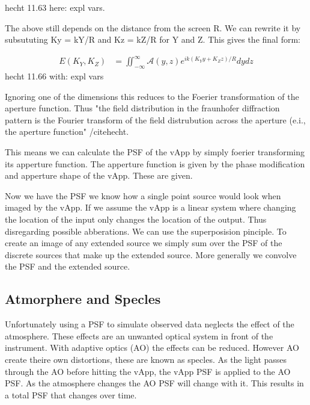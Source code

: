 hecht 11.63
here: expl vars.  

The above still depends on the distance from the screen R. We can rewrite it by subsututing Ky = kY/R and Kz = kZ/R for Y and Z. This gives the final form: 

\begin{subequations}
  \begin{align}
    E(K_Y,K_Z) &= \iint_{-\infty}^{\infty} \mathscr{A}(y,z) e^{ik(K_Yy+K_Zz)/R} dydz
  \end{align}
\end{subequations}
hecht 11.66
with: expl vars

Ignoring one of the dimensions this reduces to the Foerier transformation of the aperture function. Thus "the field distribution in the fraunhofer diffraction pattern is the Fourier transform of the field distrubution across the aperture (e.i., the aperture function" /cite{hecht}. 

This means we can calculate the PSF of the vApp by simply foerier transforming its apperture function. The apperture function is given by the phase modification and apperture shape of the vApp. These are given.

Now we have the PSF we know how a single point source would look when imaged by the vApp. If we assume the vApp is a linear system where changing the location of the input only changes the location of the output. Thus disregarding possible abberations. We can use the superposision pinciple. To create an image of any extended source we simply sum over the PSF of the discrete sources that make up the extended source. More generally we convolve the PSF and the extended source.

\subsection{Atmorphere and Specles}

Unfortunately using a PSF to simulate observed data neglects the effect of the atmosphere. These effects are an unwanted optical system in front of the instrument. With adaptive optics (AO) the effects can be reduced. However AO create theire own distortions, these are known as specles. As the light passes through the AO before hitting the vApp, the vApp PSF is applied to the AO PSF. As the atmosphere changes the AO PSF will change with it. This results in a total PSF that changes over time.

